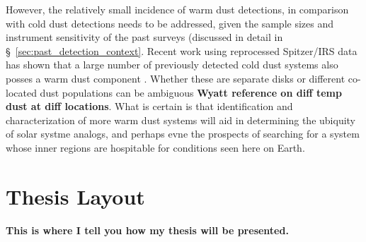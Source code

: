     
    However, the relatively small incidence of warm dust detections, in comparison with cold dust detections needs to be addressed, given the sample sizes and instrument sensitivity of the past surveys (discussed in detail in \S~\ref{sec:past_detection_context}. Recent work using reprocessed Spitzer/IRS data has shown that a large number of previously detected cold dust systems also posses a warm dust component \citep{Chen2014}. Whether these are separate disks or different co-located dust populations can be ambiguous \textbf{Wyatt reference on diff temp dust at diff locations}. What is certain is that identification and characterization of more warm dust systems will aid in determining the ubiquity of solar systme analogs, and perhaps evne the prospects of searching for a system whose inner regions are hospitable for conditions seen here on Earth. 
    
    
\section{Thesis Layout}
    
    \textbf{This is where I tell you how my thesis will be presented.}
    

    